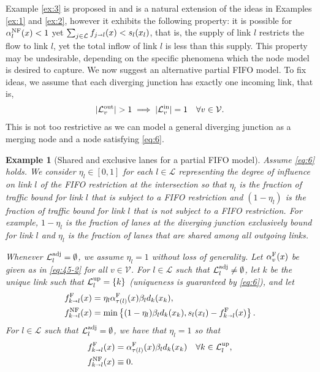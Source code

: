 \documentclass[letterpaper, 10 pt, conference]{ieeeconf}
\newcommand{\sra}{\shortrightarrow}
\newtheorem{example}{Example}
\newcommand{\fluxin}{s}
\newcommand{\fluxout}{d}
\newcommand{\Verts}{\mathcal{V}}
\newcommand{\Links}{\mathcal{L}}
\newcommand{\Lin}{\mathcal{L}^\textnormal{in}}
\newcommand{\Lout}{\mathcal{L}^\textnormal{out}}
\newcommand{\Lup}{\mathcal{L}^\textnormal{up}}
\newcommand{\Ladj}{\mathcal{L}^\textnormal{adj}}
\newcommand{\tail}{{\tau}}
\newcommand{\flow}{f}
\newcommand{\alphaF}{\alpha^\textnormal{F}}
\newcommand{\alphaNF}{\alpha^\textnormal{NF}}
\begin{document}
Example \ref{ex:3} is proposed in  \cite[Example 4]{Lovisari:2014qv} and is a natural extension of the ideas in Examples \ref{ex:1} and \ref{ex:2}, however it exhibits the following property: it is possible for $\alphaNF_l(x)<1$ yet $\sum_{j\in\Links}\flow_{j\sra l}(x)<\fluxin_l(x_l)$, that is, the supply of link $l$ restricts the flow to link $l$, yet the total inflow of link $l$ is less than this supply. This property may be undesirable, depending on the specific phenomena which the node model is desired to capture. We now suggest an alternative partial FIFO model. To fix ideas, we assume that each diverging junction has exactly one incoming link, that is,
\begin{align}
  \label{eq:6}
 |\Lout_v|>1\implies |\Lin_v|= 1 \quad \forall v\in\Verts. 
\end{align}
This is not too restrictive as we can model a general diverging junction as a merging node and a node satisfying \eqref{eq:6}.

\newcommand{\thetaF}{\theta^\textnormal{F}}
\begin{example}[Shared and exclusive lanes for a partial FIFO model]
\label{ex:4}
Assume \eqref{eq:6} holds. We consider $\eta_l\in[0,1]$ for each $l\in\Links$ representing the degree of influence on link $l$ of the FIFO restriction at the intersection so that $\eta_l$ is the fraction of traffic bound for link $l$ that is subject to a FIFO restriction and $(1-\eta_l)$ is the fraction of traffic bound for link $l$ that is not subject to a FIFO restriction. For example, $1-\eta_l$ is the fraction of lanes at the diverging junction exclusively bound for link $l$ and $\eta_l$ is the fraction of lanes that are shared among all outgoing links. 

Whenever $\Ladj_l=\emptyset$, we assume $\eta_l=1$ without loss of generality.
Let $\alphaF_v(x)$ be given as in \eqref{eq:45-2} for all $v\in\Verts$.
For $l\in\Links$ such that $\Ladj_l\neq \emptyset$, let $k$ be the unique link such that $\Lup_l=\{k\}$ (uniqueness is guaranteed by \eqref{eq:6}), and let
\begin{align}
  \label{eq:50}
  \fF_{k\sra l}(x)&=\eta_l\alphaF_{\tail(l)}(x) \beta_l\fluxout_k(x_k),\\
  \label{eq:50-2}  \fNF_{k\sra l}(x)&=\min\left\{(1-\eta_l)\beta_l\fluxout_k(x_k),\fluxin_l(x_l) -  \fF_{k\sra l}(x)\right\}.
\end{align}
For $l\in\Links$ such that $\Ladj_l=\emptyset$, we have that $\eta_l=1$ so that
\begin{align}
  \label{eq:11}
\fF_{k\sra l}(x)&=\alphaF_{\tail(l)}(x) \beta_l\fluxout_k(x_k) \quad \forall k\in\Lup_l,\\
\fNF_{k\sra l}(x)&\equiv 0.
\end{align}
\end{example}
\end{document}
